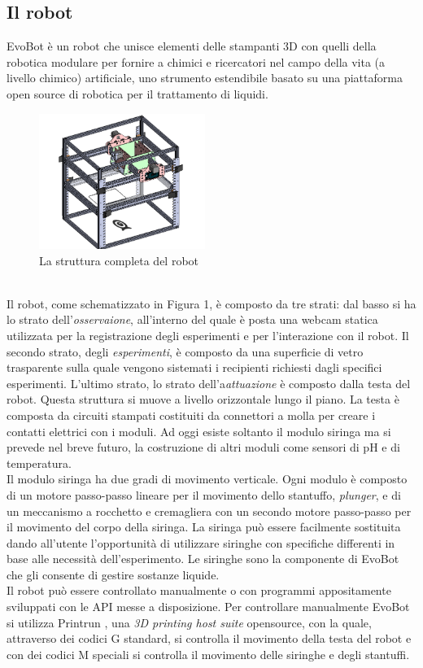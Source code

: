 \subsection{Il robot}
EvoBot è un robot che unisce elementi delle stampanti 3D con quelli della robotica modulare per fornire a chimici e ricercatori nel campo della vita (a livello chimico) artificiale, uno strumento estendibile basato su una piattaforma open source di robotica per il trattamento di liquidi.
\begin{figure}
\begin{center}
	  \includegraphics[width=0.48\textwidth]{immagini/observational-layer.png}
\end{center}
	 \caption{La struttura completa del robot}
	\end{figure} 
\\Il robot, come schematizzato in Figura 1, è composto da tre strati: dal basso si ha lo strato dell'\emph{osservaione}, all'interno del quale è posta una webcam statica utilizzata per la registrazione degli esperimenti e per l'interazione con il robot. Il secondo strato, degli \emph{esperimenti}, è composto da una superficie di vetro trasparente sulla quale vengono sistemati i recipienti richiesti dagli specifici esperimenti. L'ultimo strato, lo strato dell'a\emph{attuazione} è composto dalla testa del robot. Questa struttura si muove a livello orizzontale lungo il piano. La testa è composta da circuiti stampati costituiti da connettori a molla per creare i contatti elettrici con i moduli. Ad oggi esiste soltanto il modulo siringa ma si prevede nel breve futuro, la costruzione di altri moduli come sensori di pH e di temperatura. 
\\Il modulo siringa ha due gradi di movimento verticale. Ogni modulo è composto di un motore passo-passo lineare per il movimento dello stantuffo, \emph{plunger}, e di un meccanismo a rocchetto e cremagliera con un secondo motore passo-passo per il movimento del corpo della siringa. La siringa può essere facilmente sostituita dando all'utente l'opportunità di utilizzare siringhe con specifiche differenti in base alle necessità dell'esperimento. Le siringhe sono la componente di EvoBot che gli consente di gestire sostanze liquide. 
\\Il robot può essere controllato manualmente o con programmi appositamente sviluppati con le API messe a disposizione. Per controllare manualmente EvoBot si utilizza Printrun \cite{printrun}, una \emph{3D printing host suite}  opensource, con la quale, attraverso dei codici G standard, si controlla il movimento della testa del robot e con dei codici M speciali si controlla il movimento delle siringhe e degli stantuffi.

